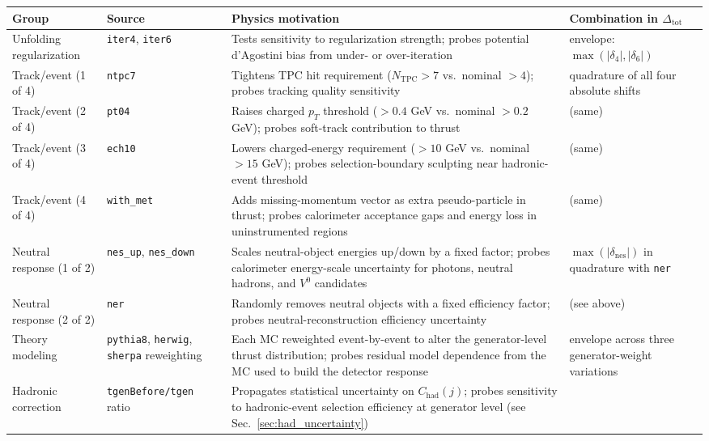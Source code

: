\begin{table}[t!]
\centering
\scriptsize
\begin{tabularx}{0.98\textwidth}{p{}p{}p{}X}
\hline
Group & Source & Physics motivation & Combination in $\Delta_\mathrm{tot}$ \\
\hline
Unfolding regularization
  & \texttt{iter4}, \texttt{iter6}
  & Tests sensitivity to regularization strength; probes potential d'Agostini bias from under- or over-iteration
  & envelope: $\max(|\delta_{4}|,|\delta_{6}|)$ \\[3pt]
Track/event (1 of 4)
  & \texttt{ntpc7}
  & Tightens TPC hit requirement ($N_\mathrm{TPC}>7$ vs.\ nominal $>4$); probes tracking quality sensitivity
  & quadrature of all four absolute shifts \\[3pt]
Track/event (2 of 4)
  & \texttt{pt04}
  & Raises charged $p_T$ threshold ($>0.4$ GeV vs.\ nominal $>0.2$ GeV); probes soft-track contribution to thrust
  & (same) \\[3pt]
Track/event (3 of 4)
  & \texttt{ech10}
  & Lowers charged-energy requirement ($>10$ GeV vs.\ nominal $>15$ GeV); probes selection-boundary sculpting near hadronic-event threshold
  & (same) \\[3pt]
Track/event (4 of 4)
  & \texttt{with\_met}
  & Adds missing-momentum vector as extra pseudo-particle in thrust; probes calorimeter acceptance gaps and energy loss in uninstrumented regions
  & (same) \\[3pt]
Neutral response (1 of 2)
  & \texttt{nes\_up}, \texttt{nes\_down}
  & Scales neutral-object energies up/down by a fixed factor; probes calorimeter energy-scale uncertainty for photons, neutral hadrons, and $V^0$ candidates
  & $\max(|\delta_\mathrm{nes}|)$ in quadrature with \texttt{ner} \\[3pt]
Neutral response (2 of 2)
  & \texttt{ner}
  & Randomly removes neutral objects with a fixed efficiency factor; probes neutral-reconstruction efficiency uncertainty
  & (see above) \\[3pt]
Theory modeling
  & \texttt{pythia8}, \texttt{herwig}, \texttt{sherpa} reweighting
  & Each MC reweighted event-by-event to alter the generator-level thrust distribution; probes residual model dependence from the MC used to build the detector response
  & envelope across three generator-weight variations \\[3pt]
Hadronic correction
  & \texttt{tgenBefore/tgen} ratio
  & Propagates statistical uncertainty on $C_\mathrm{had}(j)$; probes sensitivity to hadronic-event selection efficiency at generator level (see Sec.~\ref{sec:had_uncertainty})

\end{tabularx}
\end{table}
